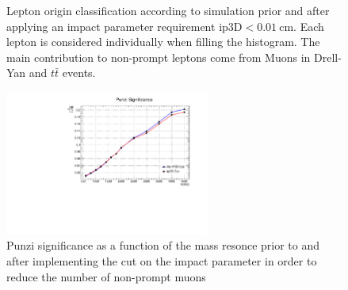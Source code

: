 \begin{figure}[tph]
  \centering
  \vfil
  \caption{Lepton origin classification according to simulation prior and after applying
    an impact parameter requirement $\mathrm{ip3D}<0.01~\mathrm{cm}$. Each lepton is considered individually
    when filling the histogram. The main contribution to non-prompt leptons come
    from Muons in Drell-Yan and $t\bar{t}$ events.
  }
  \label{fig:HFakeString}
\end{figure}


\begin{figure}[tph]
  \centering
  \includegraphics[width=0.6\textwidth]{fig/PunziTest_Ip3DCut.pdf}
  \caption{Punzi significance as a function of the mass resonce prior to and after implementing
    the cut on the impact parameter in order to reduce the number of non-prompt
    muons}
  \label{fig:Punzi_Ip3DCut}
\end{figure}


